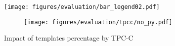 
\begin{figure}[]
    \centering
    \begin{minipage}{0.95\linewidth}
        \centering
        \texttt{[image: figures/evaluation/bar\_legend02.pdf]}
        \vspace{-5mm}
    \end{minipage}
    \begin{minipage}{0.95\linewidth}
        \centering
        \begin{subfigure}{0.95\linewidth}
            \texttt{[image: figures/evaluation/tpcc/no\_py.pdf]}
        \end{subfigure}
    \end{minipage}
    \vspace{-4mm}
    \caption{Impact of templates percentage by TPC-C}
    \label{fig:evaluation.tpcc.ratio}
    \vspace{-4mm}
\end{figure}

